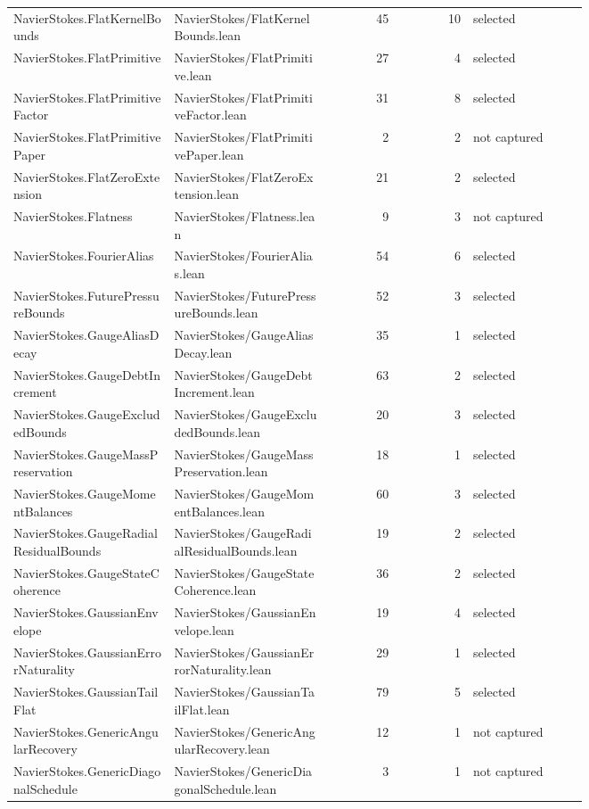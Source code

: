 \documentclass[10pt]{article}
\begin{document}
\begin{longtable}{p{0.28\linewidth}p{0.27\linewidth}r r p{0.20\linewidth}}
NavierStokes.FlatKernelBounds & NavierStokes/FlatKernelBounds.lean & 45 & 10 & selected\\
NavierStokes.FlatPrimitive & NavierStokes/FlatPrimitive.lean & 27 & 4 & selected\\
NavierStokes.FlatPrimitiveFactor & NavierStokes/FlatPrimitiveFactor.lean & 31 & 8 & selected\\
NavierStokes.FlatPrimitivePaper & NavierStokes/FlatPrimitivePaper.lean & 2 & 2 & not captured\\
NavierStokes.FlatZeroExtension & NavierStokes/FlatZeroExtension.lean & 21 & 2 & selected\\
NavierStokes.Flatness & NavierStokes/Flatness.lean & 9 & 3 & not captured\\
NavierStokes.FourierAlias & NavierStokes/FourierAlias.lean & 54 & 6 & selected\\
NavierStokes.FuturePressureBounds & NavierStokes/FuturePressureBounds.lean & 52 & 3 & selected\\
NavierStokes.GaugeAliasDecay & NavierStokes/GaugeAliasDecay.lean & 35 & 1 & selected\\
NavierStokes.GaugeDebtIncrement & NavierStokes/GaugeDebtIncrement.lean & 63 & 2 & selected\\
NavierStokes.GaugeExcludedBounds & NavierStokes/GaugeExcludedBounds.lean & 20 & 3 & selected\\
NavierStokes.GaugeMassPreservation & NavierStokes/GaugeMassPreservation.lean & 18 & 1 & selected\\
NavierStokes.GaugeMomentBalances & NavierStokes/GaugeMomentBalances.lean & 60 & 3 & selected\\
NavierStokes.GaugeRadialResidualBounds & NavierStokes/GaugeRadialResidualBounds.lean & 19 & 2 & selected\\
NavierStokes.GaugeStateCoherence & NavierStokes/GaugeStateCoherence.lean & 36 & 2 & selected\\
NavierStokes.GaussianEnvelope & NavierStokes/GaussianEnvelope.lean & 19 & 4 & selected\\
NavierStokes.GaussianErrorNaturality & NavierStokes/GaussianErrorNaturality.lean & 29 & 1 & selected\\
NavierStokes.GaussianTailFlat & NavierStokes/GaussianTailFlat.lean & 79 & 5 & selected\\
NavierStokes.GenericAngularRecovery & NavierStokes/GenericAngularRecovery.lean & 12 & 1 & not captured\\
NavierStokes.GenericDiagonalSchedule & NavierStokes/GenericDiagonalSchedule.lean & 3 & 1 & not captured\\

\end{longtable}
\end{document}
